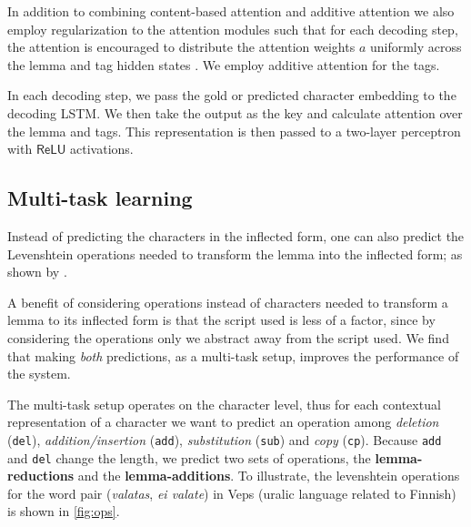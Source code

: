 \documentclass[11pt,a4paper]{article}
\begin{document}
In addition to combining content-based attention and additive
attention we also employ regularization to the attention modules such
that for each decoding step, the attention is encouraged to distribute
the attention weights $a$ uniformly across the lemma and tag hidden
states \cite{DBLP:conf/emnlp/AnastasopoulosN19,
DBLP:conf/naacl/CohnHVYDH16}. We employ additive attention for the tags.

In each decoding step, we pass the gold or predicted character embedding
to the decoding LSTM. We then take the output as the key and calculate
attention over the lemma and tags. This representation is then passed
to a two-layer perceptron with $\mathsf{ReLU}$ activations.



\subsection{Multi-task learning}

Instead of predicting the characters in the inflected form, one can
also predict the Levenshtein operations needed to transform the lemma
into the inflected form; as shown by
\cite{DBLP:conf/conll/MakarovRC17}.

A benefit of considering operations instead of characters needed to
transform a lemma to its inflected form is that the script used is
less of a factor, since by considering the operations only we abstract
away from the script used. We find that making \emph{both}
predictions, as a multi-task setup, improves the performance of the
system.

The multi-task setup operates on the character level, thus for each
contextual representation of a character we want to predict an
operation among \textit{deletion} (\texttt{del}),
\textit{addition/insertion} (\texttt{add}), \textit{substitution}
(\texttt{sub}) and \textit{copy} (\texttt{cp}). Because \texttt{add}
and \texttt{del} change the length, we predict two sets of operations,
the \textbf{lemma-reductions} and the \textbf{lemma-additions}. To
illustrate, the levenshtein operations for the word pair
(\emph{valatas}, \emph{ei valate}) in Veps (uralic language related to
Finnish) is shown in \cref{fig:ops}.
\end{document}
